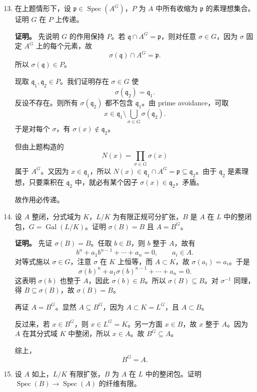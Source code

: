\documentclass[a4paper]{ctexart}
\begin{document}
\begin{enumerate}[leftmargin=*, label=\textbf{5.\arabic*.}]
\setcounter{enumi}{12}
\item 在上题情形下，设 \(\mathfrak p\in \operatorname{Spec}(A^G)\)，\(P\) 为 \(A\) 中所有收缩为 \(\mathfrak p\) 的素理想集合。证明 \(G\) 在 \(P\) 上传递。

\textbf{证明。}
先说明 \(G\) 的作用保持 \(P\)。若 \(\mathfrak q\cap A^G=\mathfrak p\)，则对任意 \(\sigma\in G\)，因为 \(\sigma\) 固定 \(A^G\) 上的每个元素，故
\[
\sigma(\mathfrak q)\cap A^G=\mathfrak p.
\]
所以 \(\sigma(\mathfrak q)\in P\)。

现取 \(\mathfrak q_1,\mathfrak q_2\in P\)。我们证明存在 \(\sigma\in G\) 使
\[
\sigma(\mathfrak q_2)=\mathfrak q_1.
\]
反设不存在。则所有 \(\sigma(\mathfrak q_2)\) 都不包含 \(\mathfrak q_1\)。由 prime avoidance，可取
\[
x\in \mathfrak q_1\setminus \bigcup_{\sigma\in G}\sigma(\mathfrak q_2).
\]
于是对每个 \(\sigma\)，有 \(\sigma(x)\notin \mathfrak q_2\)。

但由上题构造的
\[
N(x)=\prod_{\sigma\in G}\sigma(x)
\]
属于 \(A^G\)。又因为 \(x\in\mathfrak q_1\)，所以 \(N(x)\in \mathfrak q_1\cap A^G=\mathfrak p\subseteq \mathfrak q_2\)。由于 \(\mathfrak q_2\) 是素理想，只要乘积在 \(\mathfrak q_2\) 中，就必有某个因子 \(\sigma(x)\in \mathfrak q_2\)，矛盾。

故作用必传递。

\setcounter{enumi}{13}
\item 设 \(A\) 整闭，分式域为 \(K\)，\(L/K\) 为有限正规可分扩张，\(B\) 是 \(A\) 在 \(L\) 中的整闭包，\(G=\operatorname{Gal}(L/K)\)。证明 \(\sigma(B)=B\) 且 \(A=B^G\)。

\textbf{证明。}
先证 \(\sigma(B)=B\)。任取 \(b\in B\)，则 \(b\) 整于 \(A\)，故有
\[
b^n+a_1b^{n-1}+\cdots+a_n=0,\qquad a_i\in A.
\]
对等式施以 \(\sigma\in G\)，注意 \(\sigma\) 在 \(K\) 上恒等，而 \(A\subset K\)，故 \(\sigma(a_i)=a_i\)。于是
\[
\sigma(b)^n+a_1\sigma(b)^{n-1}+\cdots+a_n=0.
\]
这表明 \(\sigma(b)\) 也整于 \(A\)，因此 \(\sigma(b)\in B\)。所以 \(\sigma(B)\subseteq B\)。对 \(\sigma^{-1}\) 同理，得 \(B\subseteq \sigma(B)\)，故 \(\sigma(B)=B\)。

再证 \(A=B^G\)。显然 \(A\subseteq B^G\)，因为 \(A\subset K=L^G\)，且 \(A\subset B\)。

反过来，若 \(x\in B^G\)，则 \(x\in L^G=K\)。另一方面 \(x\in B\)，故 \(x\) 整于 \(A\)。因为 \(A\) 在其分式域 \(K\) 中整闭，所以 \(x\in A\)。故 \(B^G\subseteq A\)。

综上，
\[
B^G=A.
\]

\setcounter{enumi}{14}
\item 设 \(A\) 如上，\(L/K\) 有限扩张，\(B\) 为 \(A\) 在 \(L\) 中的整闭包。证明 \(\operatorname{Spec}(B)\to \operatorname{Spec}(A)\) 的纤维有限。


\end{enumerate}
\end{document}
